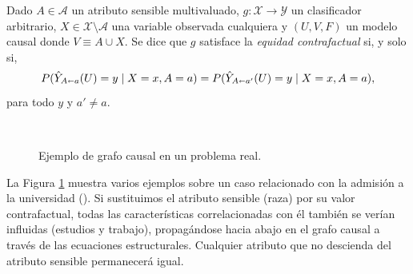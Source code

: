 \documentclass[oneside,openright,titlepage,numbers=noenddot,openany,headinclude,footinclude=true,
cleardoublepage=empty,abstractoff,BCOR=5mm,paper=a4,fontsize=12pt,main=spanish]{scrreprt}
\begin{document}
\begin{definition}
Dado $A\in \mathcal{A}$ un atributo sensible multivaluado, $g\colon \mathcal{X} \to \mathcal{Y}$ un clasificador arbitrario, $X \in \mathcal{X}\setminus \mathcal{A}$ una variable observada cualquiera y $(U,V,F)$ un modelo causal donde $V \equiv A \cup X$. Se dice que $g$ satisface la \textit{equidad contrafactual} si, y solo si, $$P(\hat{Y}_{A\shortleftarrow a}(U)=y \mid X=x, A=a)=P(\hat{Y}_{A\shortleftarrow a'}(U)=y \mid X=x, A=a),$$
para todo $y$ y $a'\neq a$. 
\end{definition}\

\begin{figure}[h]
\centering   
{}\qquad
{}\qquad
{}
\caption{Ejemplo de grafo causal en un problema real.}
\label{fig:caugraph}
\end{figure}

La Figura \ref{fig:caugraph} muestra varios ejemplos sobre un caso relacionado con la admisión a la universidad (\cite{worlds2017}). Si sustituimos el atributo sensible (raza) por su valor contrafactual, todas las características correlacionadas con él también se verían influidas (estudios y trabajo), propagándose hacia abajo en el grafo causal a través de las ecuaciones estructurales. Cualquier atributo que no descienda del atributo sensible permanecerá igual.
\end{document}
